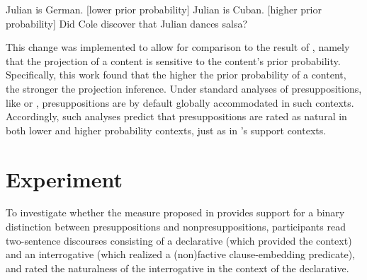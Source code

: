 \documentclass[11pt,fleqn]{article}
\newcommand{\6}{\mbox{$[\hspace*{-.6mm}[$}}
\newcommand{\9}{\mbox{$]\hspace*{-.6mm}]$}}
\newcommand{\citepos}[1]{\citeauthor{#1}'s \citeyear{#1}}
\begin{document}
\begin{exe}
\ex\label{prior}
\begin{xlist}
\ex Julian is German. \hfill [lower prior probability]
\ex Julian is Cuban. \hfill [higher prior probability]
\ex Did Cole discover that Julian dances salsa?
\end{xlist}
\end{exe}
This change was implemented to allow for comparison to the result of \citealt{degen-tonhauser-openmind}, namely that the projection of a content is sensitive to the content's prior probability. Specifically, this work found that the higher the prior probability of a content, the stronger the projection inference. Under standard analyses of presuppositions, like \citealt{heim83} or \citealt{vds92}, presuppositions are by default globally accommodated in such contexts. Accordingly, such analyses predict that presuppositions are rated as natural in both lower and higher probability contexts, just as in \citepos{mandelkern-etal2020} support contexts. 

%
%
%
%

\section{Experiment}\label{s2}

To investigate whether the measure proposed in \citealt{mandelkern-etal2020} provides support for a binary distinction between presuppositions and nonpresuppositions, participants read two-sentence discourses consisting of a declarative (which provided the context) and an interrogative (which realized a (non)factive clause-embedding predicate), and rated the naturalness of the interrogative in the context of the declarative.
\end{document}
